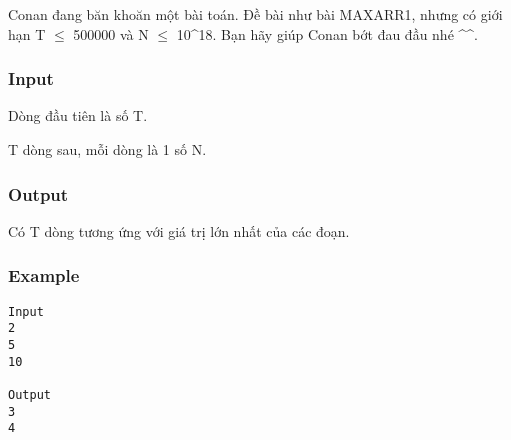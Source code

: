 



   Conan đang băn khoăn một bài toán. Đề bài như bài MAXARR1, nhưng có giới hạn T  $\le$  500000 và N  $\le$  10\textasciicircum18. Bạn hãy giúp Conan bớt đau đầu nhé \textasciicircum\textasciicircum.  

\subsubsection{   Input  }

   Dòng đầu tiên là số T.  

   T dòng sau, mỗi dòng là 1 số N.  

\subsubsection{   Output  }

   Có T dòng tương ứng với giá trị lớn nhất của các đoạn.  

\subsubsection{   Example  }
\begin{verbatim}
Input
2
5
10

Output
3
4
\end{verbatim}
